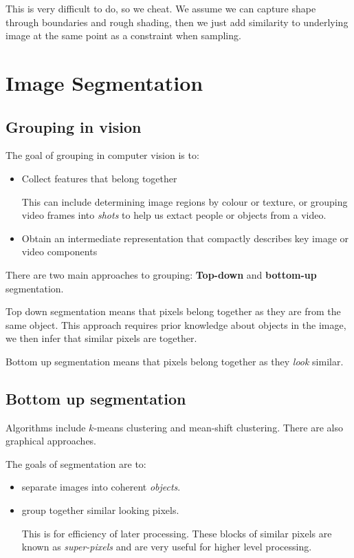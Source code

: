 \documentclass{article}
\begin{document}
This is very difficult to do, so we cheat. We assume we can capture shape through boundaries and rough shading, then we just add similarity to underlying image at the same point as a constraint when sampling.

\section{Image Segmentation}

\subsection{Grouping in vision}

The goal of grouping in computer vision is to:

\begin{itemize}
  \item Collect features that belong together

        This can include determining image regions by colour or texture, or grouping video frames into \textit{shots} to help us extact people or objects from a video.

  \item Obtain an intermediate representation that compactly describes key image or video components
\end{itemize}

There are two main approaches to grouping: \textbf{Top-down} and \textbf{bottom-up} segmentation.

Top down segmentation means that pixels belong together as they are from the same object. This approach requires prior knowledge about objects in the image, we then infer that similar pixels are together.

Bottom up segmentation means that pixels belong together as they \textit{look} similar.

\subsection{Bottom up segmentation}

Algorithms include $k$-means clustering and mean-shift clustering. There are also graphical approaches.

The goals of segmentation are to:

\begin{itemize}
  \item separate images into coherent \textit{objects}.
  \item group together similar looking pixels.

        This is for efficiency of later processing. These blocks of similar pixels are known as \textit{super-pixels} and are very useful for higher level processing.

\end{itemize}
\end{document}
